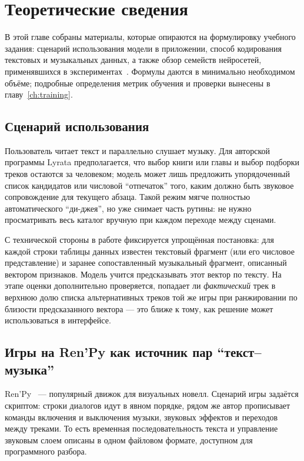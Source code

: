 \chapter{Теоретические сведения}
\label{ch:theory}

В этой главе собраны материалы, которые опираются на формулировку учебного задания: сценарий использования модели в приложении, способ кодирования текстовых и музыкальных данных, а также обзор семейств нейросетей, применявшихся в экспериментах~\cite{nikolenko2018}. Формулы даются в минимально необходимом объёме; подробные определения метрик обучения и проверки вынесены в главу~\ref{ch:training}.

\section{Сценарий использования}

Пользователь читает текст и параллельно слушает музыку. Для авторской программы Lyrata предполагается, что выбор книги или главы и выбор подборки треков остаются за человеком; модель может лишь предложить упорядоченный список кандидатов или числовой ``отпечаток'' того, каким должно быть звуковое сопровождение для текущего абзаца. Такой режим мягче полностью автоматического ``ди-джея'', но уже снимает часть рутины: не нужно просматривать весь каталог вручную при каждом переходе между сценами.

С технической стороны в работе фиксируется упрощённая постановка: для каждой строки таблицы данных известен текстовый фрагмент (или его числовое представление) и заранее сопоставленный музыкальный фрагмент, описанный вектором признаков. Модель учится предсказывать этот вектор по тексту. На этапе оценки дополнительно проверяется, попадает ли \textit{фактический} трек в верхнюю долю списка альтернативных треков той же игры при ранжировании по близости предсказанного вектора --- это ближе к тому, как решение может использоваться в интерфейсе.

\section{Игры на Ren'Py как источник пар ``текст--музыка''}

Ren'Py~\cite{srcrenpydocs} --- популярный движок для визуальных новелл. Сценарий игры задаётся скриптом: строки диалогов идут в явном порядке, рядом же автор прописывает команды включения и выключения музыки, звуковых эффектов и переходов между треками. То есть временная последовательность текста и управление звуковым слоем описаны в одном файловом формате, доступном для программного разбора.

